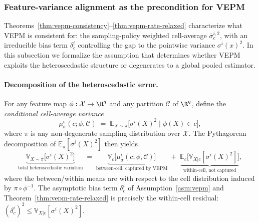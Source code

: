 \subsubsection{Feature-variance alignment as the precondition for VEPM}
\label{subsec:alignment}

Theorems~\ref{thm:vepm-consistency}--\ref{thm:vepm-rate-relaxed} characterize
what VEPM is consistent for: the sampling-policy weighted cell-average
$\bar\sigma_c^{i,2}$, with an irreducible bias term $\delta_c^i$ controlling
the gap to the pointwise variance $\sigma^i(x)^2$.  In this subsection we
formalize the assumption that determines whether VEPM exploits the
heteroscedastic structure or degenerates to a global pooled estimator.

\paragraph{Decomposition of the heteroscedastic error.}
For any feature map $\phi:\mathcal{X}\to\R^q$ and any partition
$\mathcal{C}$ of $\R^q$, define the \emph{conditional cell-average variance}
\begin{equation}\label{eq:cell-mean}
  \mu_\sigma^{i}(c;\phi,\mathcal{C})
    \;=\;
    \mathbb{E}_{X\sim\pi}\bigl[\sigma^{i}(X)^{2}\;\big|\;\phi(X)\in c\bigr],
\end{equation}
where $\pi$ is any non-degenerate sampling distribution over $\mathcal{X}$.
The Pythagorean decomposition of $\mathbb{E}_\pi[\sigma^{i}(X)^{2}]$ then
yields
\begin{equation}\label{eq:alignment-decomp}
  \underbrace{\mathbb{V}_{X\sim\pi}\!\bigl[\sigma^{i}(X)^{2}\bigr]}_{
    \text{total heteroscedastic variation}}
  \;=\;
  \underbrace{\mathbb{V}_{c}\!\bigl[\mu_\sigma^{i}(c;\phi,\mathcal{C})\bigr]}_{
    \text{between-cell, captured by VEPM}}
  \;+\;
  \underbrace{\mathbb{E}_{c}\!\bigl[\mathbb{V}_{X|c}[\sigma^{i}(X)^{2}]\bigr]}_{
    \text{within-cell, not captured}},
\end{equation}
where the between/within means are with respect to the cell distribution
induced by $\pi\circ\phi^{-1}$.  The asymptotic bias term
$\delta_c^i$ of Assumption~\ref{asm:vepm} and
Theorem~\ref{thm:vepm-rate-relaxed} is precisely the within-cell residual:
\(
  (\delta_c^i)^2 \le \mathbb{V}_{X|c}[\sigma^{i}(X)^{2}].
\)

